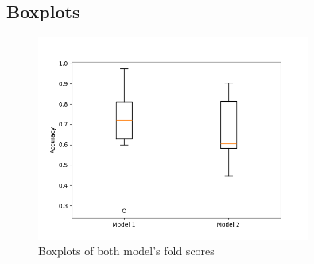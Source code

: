 \documentclass[12pt]{article}
\begin{document}
\subsection{Boxplots}
\begin{figure}[h!]
  \includegraphics[width=0.8\textwidth]{./task_2/boxplot.png}
  \caption{Boxplots of both model's fold scores}\label{fig:boxplots}
\end{figure}

\end{document}
